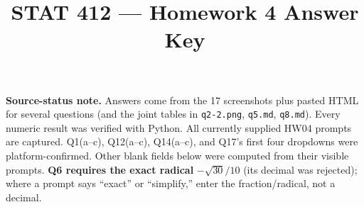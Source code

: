 \documentclass[11pt]{article}
\title{STAT 412 --- Homework 4 Answer Key}
\author{}
\date{}
\begin{document}
\maketitle

\noindent\textbf{Source-status note.} Answers come from the 17 screenshots plus
pasted HTML for several questions (and the joint tables in \texttt{q2-2.png},
\texttt{q5.md}, \texttt{q8.md}). Every numeric result was verified with Python.
All currently supplied HW04 prompts are captured. Q1(a--c), Q12(a--c),
Q14(a--c), and Q17's first four dropdowns were platform-confirmed. Other blank
fields below were computed from their visible prompts.
\textbf{Q6 requires
the exact radical} $-\sqrt{30}/10$ (its decimal was rejected); where a prompt
says ``exact'' or ``simplify,'' enter the fraction/radical, not a decimal.
\end{document}
